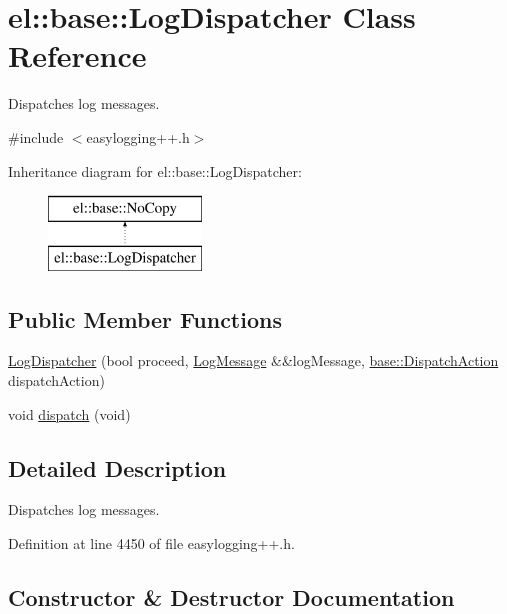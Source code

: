 \hypertarget{classel_1_1base_1_1_log_dispatcher}{}\section{el\+:\+:base\+:\+:Log\+Dispatcher Class Reference}
\label{classel_1_1base_1_1_log_dispatcher}


Dispatches log messages.  




{\ttfamily \#include $<$easylogging++.\+h$>$}

Inheritance diagram for el\+:\+:base\+:\+:Log\+Dispatcher\+:\begin{figure}[H]
\begin{center}
\leavevmode
\includegraphics[height=2.000000cm]{classel_1_1base_1_1_log_dispatcher}
\end{center}
\end{figure}
\subsection*{Public Member Functions}
\begin{DoxyCompactItemize}
\item 
\hyperlink{classel_1_1base_1_1_log_dispatcher_aef59d9895c348f0b3ad5a776276f1c22}{Log\+Dispatcher} (bool proceed, \hyperlink{classel_1_1_log_message}{Log\+Message} \&\&log\+Message, \hyperlink{namespaceel_1_1base_a3aa2563d38e47388ba242a1694fc2839}{base\+::\+Dispatch\+Action} dispatch\+Action)
\item 
void \hyperlink{classel_1_1base_1_1_log_dispatcher_a88d4a644364bb454136c85338f05da7a}{dispatch} (void)
\end{DoxyCompactItemize}


\subsection{Detailed Description}
Dispatches log messages. 

Definition at line 4450 of file easylogging++.\+h.



\subsection{Constructor \& Destructor Documentation}
\hypertarget{classel_1_1base_1_1_log_dispatcher_aef59d9895c348f0b3ad5a776276f1c22}{}
